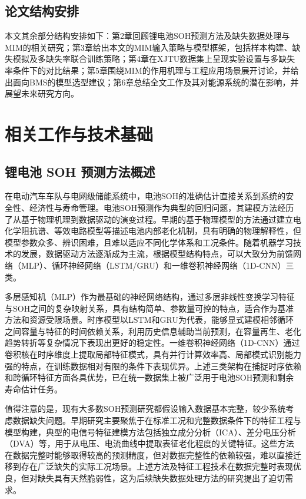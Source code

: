 \documentclass[10pt,a4paper]{ctexart}
\begin{document}
\subsection{论文结构安排}

本文其余部分结构安排如下：第2章回顾锂电池SOH预测方法及缺失数据处理与MIM的相关研究；第3章给出本文的MIM输入策略与模型框架，包括样本构建、缺失模拟及多缺失率联合训练策略；第4章在XJTU数据集上呈现实验设置与多缺失率条件下的对比结果；第5章围绕MIM的作用机理与工程应用场景展开讨论，并给出面向BMS的模型选型建议；第6章总结全文工作及其对能源系统的潜在影响，并展望未来研究方向。

\section{相关工作与技术基础}\label{sec:related}

\subsection{锂电池 SOH 预测方法概述}

在电动汽车车队与电网级储能系统中，电池SOH的准确估计直接关系到系统的安全性、经济性与寿命管理。电池SOH预测作为典型的回归问题，其建模方法经历了从基于物理机理到数据驱动的演变过程\cite{liu2025deep}。早期的基于物理模型的方法通过建立电化学阻抗谱、等效电路模型等描述电池内部老化机制，具有明确的物理解释性，但模型参数众多、辨识困难，且难以适应不同化学体系和工况条件。随着机器学习技术的发展，数据驱动方法逐渐成为主流\cite{liu2025deep}，根据模型结构特点，可以大致分为前馈网络（MLP）、循环神经网络（LSTM/GRU）和一维卷积神经网络（1D-CNN）三类。

多层感知机（MLP）作为最基础的神经网络结构，通过多层非线性变换学习特征与SOH之间的复杂映射关系，具有结构简单、参数量可控的特点，适合作为基准方法和资源受限场景\cite{bairwa2025cycle}。时序模型以LSTM和GRU为代表，能够显式建模相邻循环之间容量与特征的时间依赖关系，利用历史信息辅助当前预测，在容量再生、老化趋势转折等复杂情况下表现出更好的稳定性。一维卷积神经网络（1D-CNN）通过卷积核在时序维度上提取局部特征模式，具有并行计算效率高、局部模式识别能力强的特点，在训练数据相对有限的条件下表现优异\cite{zhang2024cnnsoh}。上述三类架构在捕捉时序依赖和跨循环特征方面各具优势，已在统一数据集上被广泛用于电池SOH预测和剩余寿命估计任务\cite{bairwa2025cycle}。

值得注意的是，现有大多数SOH预测研究都假设输入数据基本完整，较少系统考虑数据缺失问题\cite{shao2025soh,deng2025novel}。早期研究主要聚焦于在标准工况和完整数据条件下的特征工程与模型构建，典型的电信号特征建模方法包括独立成分分析（ICA）、差分电压分析（DVA）等，用于从电压、电流曲线中提取表征老化程度的关键特征\cite{deng2025novel}。这些方法在数据完整时能够取得较高的预测精度，但对数据完整性的依赖较强，难以直接迁移到存在广泛缺失的实际工况场景。上述方法及特征工程技术在数据完整时表现优良，但对缺失具有天然脆弱性，这为后续缺失数据处理方法的研究提出了迫切需求。
\end{document}
